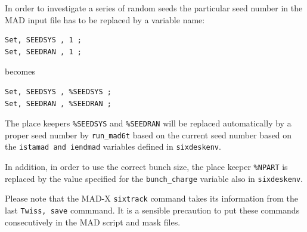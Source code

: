 \documentclass{article}    %
\begin{document}
In order to investigate a
series of random seeds the particular seed number in the MAD input
file has to be replaced by a variable name:
\begin{verbatim}
Set, SEEDSYS , 1 ;
Set, SEEDRAN , 1 ;
\end{verbatim}
becomes
\begin{verbatim}
Set, SEEDSYS , %SEEDSYS ;
Set, SEEDRAN , %SEEDRAN ;
\end{verbatim}
The place keepers {\tt \%SEEDSYS} and {\tt \%SEEDRAN} will be replaced
automatically by a proper seed number by {\tt run\_mad6t} based on the
current seed number based on the {\tt istamad and iendmad} variables
defined in {\tt sixdeskenv}. 

In addition, in order to use the correct bunch size, the place keeper 
{\tt \%NPART} is replaced by the value specified for the {\tt bunch\_charge}
 variable also in {\tt sixdeskenv}.

Please note that the MAD-X {\tt sixtrack} command takes its
information from the last {\tt Twiss, save} commmand. It is a
sensible precaution to put these commands consecutively in the MAD
script and mask files.
\end{document}
